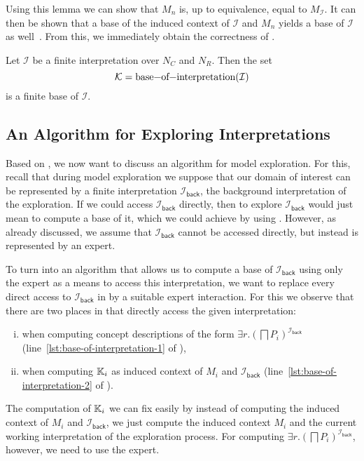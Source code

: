 Using this lemma we can show that $M_{n}$ is, up to equivalence, equal to
$M_{\mathcal{I}}$.  It can then be shown that a base of the induced context of
$\mathcal{I}$ and $M_{n}$ yields a base of $\mathcal{I}$ as
well~\cite[Corollary~5.14]{Diss-Felix}.  From this, we immediately obtain the correctness
of .

\begin{Theorem}
  \label{thm:Felix-6.9}
  Let $\mathcal{I}$ be a finite interpretation over $N_{C}$ and $N_{R}$.  Then the set
  \begin{equation*}
    \mathcal{K} = \text{\lstinline{base-of-interpretation}}(\mathcal{I})
  \end{equation*}
  is a finite base of $\mathcal{I}$.
\end{Theorem}

\subsection{An Algorithm for Exploring Interpretations}
\label{sec:an-algor-expl}

Based on , we now want to discuss an algorithm for model
exploration.  For this, recall that during model exploration we suppose that our domain of
interest can be represented by a finite interpretation $\mathcal{I}_{\mathsf{back}}$, the
background interpretation of the exploration.  If we could access
$\mathcal{I}_{\mathsf{back}}$ directly, then to explore $\mathcal{I}_{\mathsf{back}}$
would just mean to compute a base of it, which we could achieve by using
.  However, as already discussed, we assume that
$\mathcal{I}_{\mathsf{back}}$ cannot be accessed directly, but instead is represented by
an expert.

To turn  into an algorithm that allows us to compute a
base of $\mathcal{I}_{\mathsf{back}}$ using only the expert as a means to access this
interpretation, we want to replace every direct access to $\mathcal{I}_{\mathsf{back}}$ in
 by a suitable expert interaction.  For this we observe
that there are two places in  that directly access the
given interpretation:
\begin{enumerate}[i. ]
\item when computing concept descriptions of the form $\exists r.(\bigsqcap
  P_{i})^{\mathcal{I}_{\mathsf{back}}}$ (line~\ref{lst:base-of-interpretation-1} of
  ),
\item when computing ${\mathbb{K}}_{i}$ as induced context of $M_{i}$ and
  $\mathcal{I}_{\mathsf{back}}$ (line~\ref{lst:base-of-interpretation-2} of
  ).
\end{enumerate}
The computation of ${\mathbb{K}}_{i}$ we can fix easily by instead of computing the induced
context of $M_{i}$ and $\mathcal{I}_{\mathsf{back}}$, we just compute the induced context
$M_{i}$ and the current working interpretation of the exploration process.  For computing
$\exists r. (\bigsqcap P_{i})^{\mathcal{I}_{\mathsf{back}}}$, however, we need to use the
expert.

